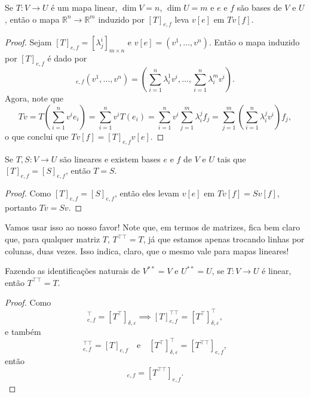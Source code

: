 \begin{proposition}
    Se $T \colon V \to U$ é um mapa linear, $\dim V = n$, $\dim U = m$ e $e$ e $f$ são bases de $V$ e $U$, então o mapa $\mathbb{R}^n \to \mathbb{R}^m$ induzido por $[T]_{e,f}$ leva $v[e]$ em $Tv[f]$.
\end{proposition}
\begin{proof}
    Sejam $[T]_{e,f} = [\lambda^i_j]_{m \times n}$ e $v[e] = (v^1, \dots, v^n)$. Então o mapa induzido por $[T]_{e,f}$ é dado por \begin{equation}
        [T]_{e,f}(v^1, \dots, v^n) = \left(\sum_{i = 1}^n \lambda^1_i v^i, \dots, \sum_{i = 1}^n \lambda^m_i v^i\right).
    \end{equation} Agora, note que \begin{equation}
        Tv = T\left(\sum_{i = 1}^n v^i e_i\right) = \sum_{i = 1}^n v^i T(e_i) = \sum_{i = 1}^n v^i \sum_{j = 1}^m \lambda^j_i f_j = \sum_{j = 1}^m \left(\sum_{i = 1}^n \lambda^j_i v^i\right) f_j,
    \end{equation} o que conclui que $Tv[f] = [T]_{e,f}v[e]$.
\end{proof}

\begin{corollary}
    Se $T, S \colon V \to U$ são lineares e existem bases $e$ e $f$ de $V$ e $U$ tais que $[T]_{e,f} = [S]_{e,f}$, então $T = S$.
\end{corollary}
\begin{proof}
    Como $[T]_{e,f} = [S]_{e,f}$, então eles levam $v[e]$ em $Tv[f] = Sv[f]$, portanto $Tv = Sv$.
\end{proof}

Vamos usar isso ao nosso favor! Note que, em termos de matrizes, fica bem claro que, para qualquer matriz $T$, $T^{\top\top} = T$, já que estamos apenas trocando linhas por colunas, duas vezes. Isso indica, claro, que o mesmo vale para mapas lineares!

\begin{proposition}
    Fazendo as identificações naturais de $V^{**} = V$ e $U^{**} = U$, se $T \colon V \to U$ é linear, então $T^{\top\top} = T$.
\end{proposition}
\begin{proof}
    Como \begin{equation}
        [T]^\top_{e,f} = [T^\top]_{\delta, \varepsilon} \implies [T]^{\top \top}_{e,f} = [T^\top]^\top_{\delta, \varepsilon},
    \end{equation} e também \begin{equation}
        [T]^{\top\top}_{e,f} = [T]_{e,f} \quad \text{e} \quad [T^\top]^\top_{\delta, \varepsilon} = [T^{\top\top}]_{e,f},
    \end{equation} então \begin{equation}
        [T]_{e,f} = [T^{\top\top}]_{e,f}.
    \end{equation}
\end{proof}

